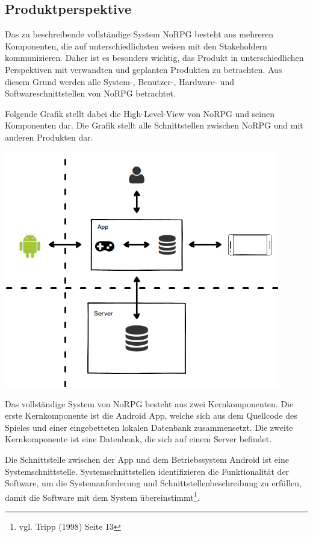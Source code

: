 	\subsection{Produktperspektive}
		Das zu beschreibende vollständige System NoRPG besteht aus mehreren Komponenten, die auf unterschiedlichsten weisen mit den Stakeholdern kommunizieren. Daher ist es besonders wichtig, das Produkt in unterschiedlichen Perspektiven mit verwandten und geplanten Produkten zu betrachten. Aus diesem Grund werden alle System-, Benutzer-, Hardware- und Softwareschnittstellen von NoRPG betrachtet. 
		
		Folgende Grafik stellt dabei die High-Level-View von NoRPG und seinen Komponenten dar. Die Grafik stellt alle Schnittstellen zwischen NoRPG und mit anderen Produkten dar.
		
		\begin{center}
			\includegraphics[width=12cm]{pics/HighLevelView.png}
		\end{center}
		
		Das vollständige System von NoRPG besteht aus zwei Kernkomponenten. Die erste Kernkomponente ist die Android App, welche sich aus dem Quellcode des Spieles und einer eingebetteten lokalen Datenbank zusammensetzt. Die zweite Kernkomponente ist eine Datenbank, die sich auf einem Server befindet.
		
		Die Schnittstelle zwischen der App und dem Betriebssystem Android ist eine Systemschnittstelle. Systemschnittstellen identifizieren die Funktionalität der Software, um die Systemanforderung und Schnittstellenbeschreibung zu erfüllen, damit die Software mit dem System übereinstimmt\footnote{vgl. Tripp \cite{srsIEEE}(1998) Seite 13}.
		
